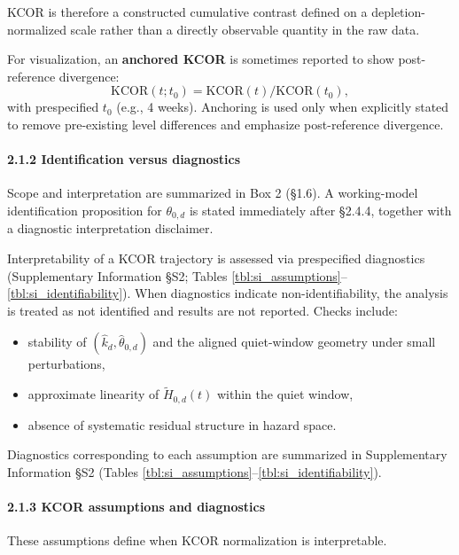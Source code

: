 \documentclass[
]{article}
\providecommand{\tightlist}{%
  \setlength{\itemsep}{0pt}\setlength{\parskip}{0pt}}
\begin{document}
KCOR is therefore a constructed cumulative contrast defined on a
depletion-normalized scale rather than a directly observable quantity in
the raw data.

For visualization, an \textbf{anchored KCOR} is sometimes reported to
show post-reference divergence: \[
\mathrm{KCOR}(t; t_0) = \mathrm{KCOR}(t)/\mathrm{KCOR}(t_0),
\] with prespecified \(t_0\) (e.g., 4 weeks). Anchoring is used only
when explicitly stated to remove pre-existing level differences and
emphasize post-reference divergence.

\paragraph{2.1.2 Identification versus
diagnostics}\label{identification-versus-diagnostics}

Scope and interpretation are summarized in Box 2 (§1.6). A working-model
identification proposition for \(\theta_{0,d}\) is stated immediately
after §2.4.4, together with a diagnostic interpretation disclaimer.

Interpretability of a KCOR trajectory is assessed via prespecified
diagnostics (Supplementary Information §S2; Tables
\ref{tbl:si_assumptions}--\ref{tbl:si_identifiability}). When
diagnostics indicate non-identifiability, the analysis is treated as not
identified and results are not reported. Checks include:

\begin{itemize}
\tightlist
\item
  stability of \((\hat{k}_d,\hat{\theta}_{0,d})\) and the aligned
  quiet-window geometry under small perturbations,
\item
  approximate linearity of \(\tilde H_{0,d}(t)\) within the quiet
  window,
\item
  absence of systematic residual structure in hazard space.
\end{itemize}

Diagnostics corresponding to each assumption are summarized in
Supplementary Information §S2 (Tables
\ref{tbl:si_assumptions}--\ref{tbl:si_identifiability}).

\paragraph{2.1.3 KCOR assumptions and
diagnostics}\label{kcor-assumptions-and-diagnostics}

These assumptions define when KCOR normalization is interpretable.
\end{document}
